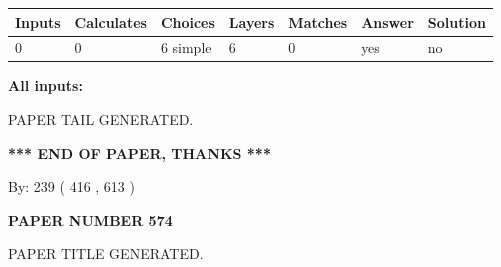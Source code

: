 \documentclass[12pt]{article}
\begin{document}
   
\noindent\begin{tabular}{|l|l|l|l|l|l|l|}
 \hline
Inputs & Calculates & Choices & Layers & Matches & Answer & Solution \\ \hline
 0  & 
 0  & 
 6
  simple  
  & 
 6  & 
 0  & 
  yes & 
  no 
  \\ \hline
 \end{tabular}
   
   
   
   
\noindent{}
   
   
   
   
\noindent\vspace{0.1in}\hspace{-0.08in} {\textbf{\Large{All inputs: }}}
   
   
   
   
   
   
 \vspace{0.2in}
 
   
   
\vspace{2.0in} PAPER TAIL GENERATED.
   
   
   
   
\vspace{1.0in} 
{\textbf{\large{ *** END OF PAPER, THANKS *** }}} 
   
   
\hspace{1.0in} By: 
 239 ( 416 ,  613 )
   
   
   
   
\newpage 
\setcounter{page}{ 
   574001 } 
   
   
   
   
 {\textbf{ \Large{ PAPER NUMBER  574  }}}
   
   
\vspace{0.2in}
   
   
   
   
   
   
   
   
 \vspace{0.2in}
 
 
 
 
   
   
 PAPER TITLE GENERATED.
   
   
   
\vspace{0.2in}
   
\end{document}
